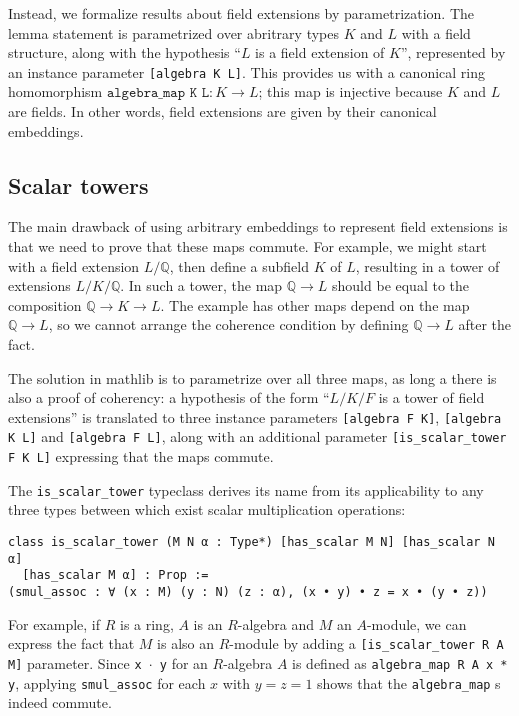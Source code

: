 \documentclass[a4paper,USenglish,cleveref, autoref, thm-restate]{lipics-v2021}
\newcommand{\lean}[1]{\texttt{#1}\xspace} %
\newcommand{\mathlib}{\textsf{mathlib}\xspace}
\newcommand{\Q}{\mathbb{Q}}
\begin{document}
Instead, we formalize results about field extensions by parametrization.
The lemma statement is parametrized over abritrary types $K$ and $L$ with a field structure,
along with the hypothesis ``$L$ is a field extension of $K$'', represented by an instance parameter \lean{[algebra K L]}.
This provides us with a canonical ring homomorphism $\lean{algebra\_map K L} : K \to L$; this map is injective because $K$ and $L$ are fields.
In other words, field extensions are given by their canonical embeddings.

\subsection{Scalar towers} \label{sec:scalar_tower}

The main drawback of using arbitrary embeddings to represent field extensions is that we need to prove that these maps commute.
For example, we might start with a field extension $L / \Q$, then define a subfield $K$ of $L$,
resulting in a tower of extensions $L / K / \Q$.
In such a tower, the map $\Q \to L$ should be equal to the composition $\Q \to K \to L$.
The example has other maps depend on the map $\Q \to L$, so we cannot arrange the coherence condition by defining $\Q \to L$ after the fact.

The solution in \mathlib is to parametrize over all three maps, as long a there is also a proof of coherency:
a hypothesis of the form ``$L / K / F$ is a tower of field extensions'' is translated to three instance parameters \lean{[algebra F K]}, \lean{[algebra K L]} and \lean{[algebra F L]},
along with an additional parameter \lean{[is\_scalar\_tower F K L]} expressing that the maps commute.

The \lean{is\_scalar\_tower} typeclass derives its name from its applicability to any three types between which exist scalar multiplication operations:
\begin{lstlisting}
class is_scalar_tower (M N α : Type*) [has_scalar M N] [has_scalar N α]
  [has_scalar M α] : Prop :=
(smul_assoc : ∀ (x : M) (y : N) (z : α), (x • y) • z = x • (y • z))
\end{lstlisting}
For example, if $R$ is a ring, $A$ is an $R$-algebra and $M$ an $A$-module, we can express the fact that $M$ is also an $R$-module by adding a \lean{[is\_scalar\_tower R A M]} parameter.
Since \lean{x $\cdot$ y} for an $R$-algebra $A$ is defined as \lean{algebra\_map R A x * y}, applying \lean{smul\_assoc} for each $x$ with $y = z = 1$ shows that the \lean{algebra\_map}s indeed commute.
\end{document}
